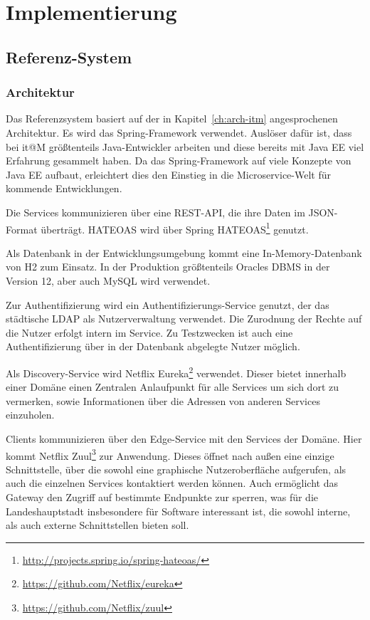 \documentclass[12pt,a4paper,bibliography=totocnumbered,listof=totocnumbered]{scrartcl}
\begin{document}
\section{Implementierung}\label{ch:implementierung}

\subsection{Referenz-System}

\subsubsection{Architektur}

Das Referenzsystem basiert auf der in Kapitel~\ref{ch:arch-itm} angesprochenen Architektur. Es wird das Spring-Framework verwendet. Auslöser dafür ist, dass bei it@M größtenteils Java-Entwickler arbeiten und diese bereits mit Java EE viel Erfahrung gesammelt haben. Da das Spring-Framework auf viele Konzepte von Java EE aufbaut, erleichtert dies den Einstieg in die Microservice-Welt für kommende Entwicklungen.

Die Services kommunizieren über eine REST-\ac{API}, die ihre Daten im JSON-Format überträgt. \ac{HATEOAS} wird über Spring \ac{HATEOAS}\footnote{\url{http://projects.spring.io/spring-hateoas/}} genutzt.

Als Datenbank in der Entwicklungsumgebung kommt eine In-Memory-Datenbank von H2 zum Einsatz. In der Produktion größtenteils Oracles DBMS in der Version 12, aber auch MySQL wird verwendet.

Zur Authentifizierung wird ein Authentifizierungs-Service genutzt, der das städtische \acs{LDAP} als Nutzerverwaltung verwendet. Die Zurodnung der Rechte auf die Nutzer erfolgt intern im Service. Zu Testzwecken ist auch eine Authentifizierung über in der Datenbank abgelegte Nutzer möglich.

Als Discovery-Service wird Netflix Eureka\footnote{\url{https://github.com/Netflix/eureka}} verwendet. Dieser bietet innerhalb einer Domäne einen Zentralen Anlaufpunkt für alle Services um sich dort zu vermerken, sowie Informationen über die Adressen von anderen Services einzuholen.

Clients kommunizieren über den Edge-Service mit den Services der Domäne. Hier kommt Netflix Zuul\footnote{\url{https://github.com/Netflix/zuul}} zur Anwendung. Dieses öffnet nach außen eine einzige Schnittstelle, über die sowohl eine graphische Nutzeroberfläche aufgerufen, als auch die einzelnen Services kontaktiert werden können. Auch ermöglicht das Gateway den Zugriff auf bestimmte Endpunkte zur sperren, was für die Landeshauptstadt insbesondere für Software interessant ist, die sowohl interne, als auch externe Schnittstellen bieten soll.
\end{document}
